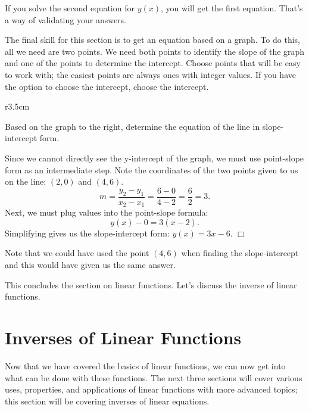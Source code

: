 \documentclass[lang=en,11pt]{elegantbook}
\begin{document}
\begin{remark}
If you solve the second equation for $y(x)$, you will get the first equation.  That's a way of validating your answers.
\end{remark}
The final skill for this section is to get an equation based on a graph.  To do this, all we need are two points.  We need both points to identify the slope of the graph and one of the points to determine the intercept.  Choose points that will be easy to work with; the easiest points are always ones with integer values.  If you have the option to choose the intercept, choose the intercept.
\begin{wrapfigure}{r}{3.5cm}
\end{wrapfigure}
\begin{example}
Based on the graph to the right, determine the equation of the line in slope-intercept form.
\end{example}
\begin{solution}
Since we cannot directly see the y-intercept of the graph, we must use point-slope form as an intermediate step.  Note the coordinates of the two points given to us on the line: $(2,0)$ and $(4,6)$.  $$m=\dfrac{y_2-y_1}{x_2-x_1}=\dfrac{6-0}{4-2}=\dfrac{6}{2}=3.$$
Next, we must plug values into the point-slope formula: $$y(x)-0=3(x-2).$$
Simplifying gives us the slope-intercept form: $y(x)=3x-6$.  $\Box$
\end{solution}
\begin{remark}
Note that we could have used the point $(4,6)$ when finding the slope-intercept and this would have given us the same answer.
\end{remark}

This concludes the section on linear functions.  Let's discuss the inverse of linear functions.
\section{Inverses of Linear Functions}
Now that we have covered the basics of linear functions, we can now get into what can be done with these functions.  The next three sections will cover various uses, properties, and applications of linear functions with more advanced topics; this section will be covering inverses of linear equations.  
\end{document}
